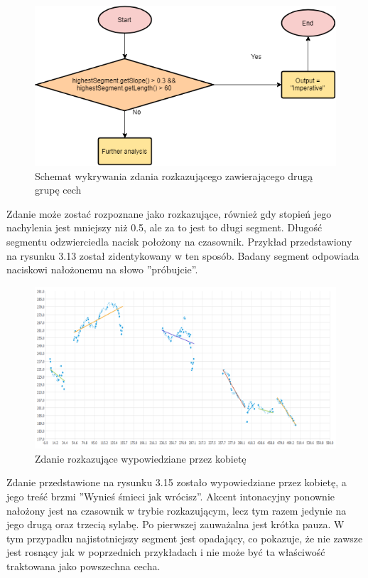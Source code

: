 \documentclass[a4paper,12 pt]{report}
\begin{document}
 \FloatBarrier
\begin{figure}[h]
\centering
\includegraphics[scale=0.9]{Imperative2.png}
\caption{Schemat wykrywania zdania rozkazującego zawierającego drugą grupę cech}
\end{figure}
\FloatBarrier
Zdanie może zostać rozpoznane jako rozkazujące, również gdy stopień jego nachylenia jest mniejszy niż 0.5, ale za to jest to długi segment. Długość segmentu odzwierciedla nacisk położony na czasownik. Przykład przedstawiony na rysunku 3.13 został zidentykowany w ten sposób. Badany segment odpowiada naciskowi nałożonemu na słowo ''próbujcie''.
 \FloatBarrier
\begin{figure}[h]
\centering
\includegraphics[scale=0.7]{rozkaz_3.pdf}
\caption{Zdanie rozkazujące wypowiedziane przez kobietę}
\end{figure}
\FloatBarrier
Zdanie przedstawione na rysunku 3.15 zostało wypowiedziane przez kobietę, a jego treść brzmi ''Wynieś śmieci jak wrócisz''. Akcent intonacyjny ponownie nałożony jest na czasownik w trybie rozkazującym, lecz tym razem jedynie na jego drugą oraz trzecią sylabę. Po pierwszej zauważalna jest krótka pauza.
W tym przypadku najistotniejszy segment jest opadający, co pokazuje, że nie zawsze jest rosnący jak w poprzednich przykładach i nie może być ta właściwość traktowana jako powszechna cecha.
\end{document}
